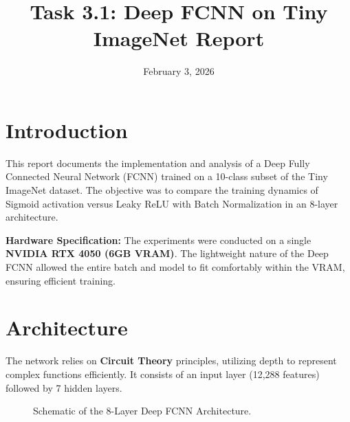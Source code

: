 \documentclass{article}
\title{Task 3.1: Deep FCNN on Tiny ImageNet Report}\date{February 3, 2026}
\begin{document}
\maketitle

\section{Introduction}
This report documents the implementation and analysis of a Deep Fully Connected Neural Network (FCNN) trained on a 10-class subset of the Tiny ImageNet dataset. The objective was to compare the training dynamics of Sigmoid activation versus Leaky ReLU with Batch Normalization in an 8-layer architecture.

\textbf{Hardware Specification:} The experiments were conducted on a single \textbf{NVIDIA RTX 4050 (6GB VRAM)}. The lightweight nature of the Deep FCNN allowed the entire batch and model to fit comfortably within the VRAM, ensuring efficient training.

\section{Architecture}
The network relies on \textbf{Circuit Theory} principles, utilizing depth to represent complex functions efficiently. It consists of an input layer (12,288 features) followed by 7 hidden layers.

\begin{figure}[h]
    \centering
    \caption{Schematic of the 8-Layer Deep FCNN Architecture.}
    \label{fig:network}
\end{figure}
\end{document}
